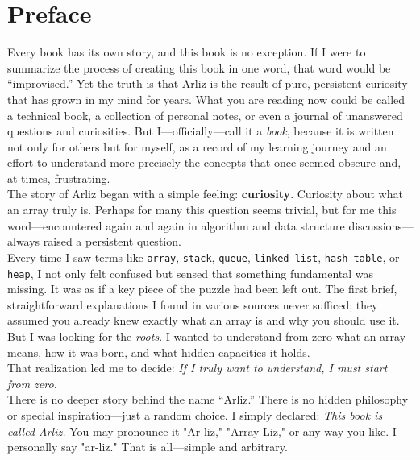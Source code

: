 \documentclass[12pt, oneside]{book}
\begin{document}
	\newpage
	\chapter*{Preface}
	\thispagestyle{empty}
	
	Every book has its own story, and this book is no exception. If I were to summarize the process of creating this book in one word, that word would be “improvised.” Yet the truth is that Arliz is the result of pure, persistent curiosity that has grown in my mind for years. What you are reading now could be called a technical book, a collection of personal notes, or even a journal of unanswered questions and curiosities. But I—officially—call it a \emph{book}, because it is written not only for others but for myself, as a record of my learning journey and an effort to understand more precisely the concepts that once seemed obscure and, at times, frustrating.\\
	The story of Arliz began with a simple feeling: \textbf{curiosity}.  
	Curiosity about what an array truly is. Perhaps for many this question seems trivial, but for me this word—encountered again and again in algorithm and data structure discussions—always raised a persistent question.\\
	Every time I saw terms like \texttt{array}, \texttt{stack}, \texttt{queue}, \texttt{linked list}, \texttt{hash table}, or \texttt{heap}, I not only felt confused but sensed that something fundamental was missing. It was as if a key piece of the puzzle had been left out. The first brief, straightforward explanations I found in various sources never sufficed; they assumed you already knew exactly what an array is and why you should use it. But I was looking for the \emph{roots}. I wanted to understand from zero what an array means, how it was born, and what hidden capacities it holds.\\
	That realization led me to decide:  
	\emph{If I truly want to understand, I must start from zero.}\\	
	There is no deeper story behind the name “Arliz.” There is no hidden philosophy or special inspiration—just a random choice. I simply declared:  
	\emph{This book is called Arliz.}  
	You may pronounce it "Ar-liz," "Array-Liz," or any way you like. I personally say "ar-liz." That is all—simple and arbitrary.\\	
\end{document}
